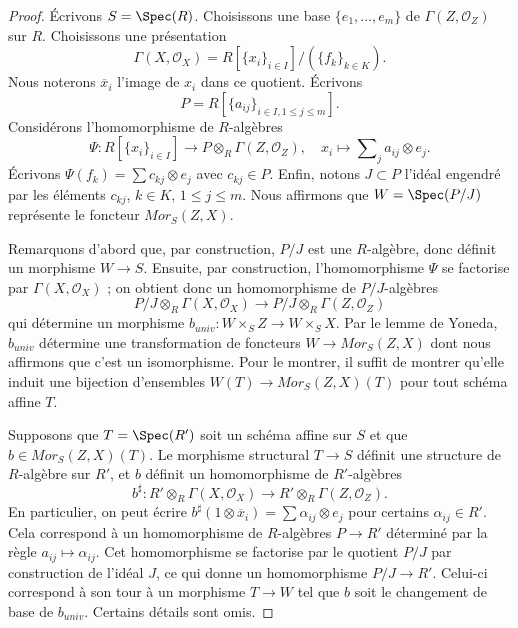\begin{proof}
Écrivons $S = \Spec(R)$. Choisissons une base $\{e_1, \ldots, e_m\}$
de $\Gamma(Z, \mathcal{O}_Z)$ sur $R$. Choisissons une présentation
$$
\Gamma(X, \mathcal{O}_X) = R[\{x_i\}_{i \in I}]/(\{f_k\}_{k \in K}).
$$
Nous noterons $\overline{x}_i$ l'image de $x_i$ dans ce quotient.
Écrivons
$$
P = R[\{a_{ij}\}_{i \in I, 1 \leq j \leq m}].
$$
Considérons l'homomorphisme de $R$-algèbres
$$
\Psi :
R[\{x_i\}_{i \in I}]
\longrightarrow
P \otimes_R \Gamma(Z, \mathcal{O}_Z), \quad
x_i \longmapsto \sum\nolimits_j a_{ij} \otimes e_j.
$$
Écrivons $\Psi(f_k) = \sum c_{kj} \otimes e_j$ avec $c_{kj} \in P$.
Enfin, notons $J \subset P$ l'idéal engendré par les éléments
$c_{kj}$, $k \in K$, $1 \leq j \leq m$. Nous affirmons que
$W = \Spec(P/J)$ représente le foncteur $\mathit{Mor}_S(Z, X)$.

\medskip\noindent
Remarquons d'abord que, par construction, $P/J$ est une $R$-algèbre, donc définit
un morphisme $W \to S$. Ensuite, par construction, l'homomorphisme
$\Psi$ se factorise par $\Gamma(X, \mathcal{O}_X)$ ; on obtient donc
un homomorphisme de $P/J$-algèbres
$$
P/J \otimes_R \Gamma(X, \mathcal{O}_X)
\longrightarrow
P/J \otimes_R \Gamma(Z, \mathcal{O}_Z)
$$
qui détermine un morphisme
$b_{univ} : W \times_S Z \to W \times_S X$.
Par le lemme de Yoneda, $b_{univ}$ détermine une
transformation de foncteurs $W \to \mathit{Mor}_S(Z, X)$ dont nous
affirmons que c'est un isomorphisme. Pour le montrer, il suffit
de montrer qu'elle induit une bijection d'ensembles
$W(T) \to \mathit{Mor}_S(Z, X)(T)$ pour tout schéma affine
$T$.

\medskip\noindent
Supposons que $T = \Spec(R')$ soit un schéma affine sur $S$
et que $b \in \mathit{Mor}_S(Z, X)(T)$. Le morphisme structural $T \to S$
définit une structure de $R$-algèbre sur $R'$, et $b$ définit un homomorphisme de $R'$-algèbres
$$
b^\sharp :
R' \otimes_R \Gamma(X, \mathcal{O}_X)
\longrightarrow
R' \otimes_R \Gamma(Z, \mathcal{O}_Z).
$$
En particulier, on peut écrire
$b^\sharp(1 \otimes \overline{x}_i) = \sum \alpha_{ij} \otimes e_j$
pour certains $\alpha_{ij} \in R'$. Cela correspond à un homomorphisme de $R$-algèbres
$P \to R'$ déterminé par la règle $a_{ij} \mapsto \alpha_{ij}$. Cet
homomorphisme se factorise par le quotient $P/J$ par construction de l'idéal
$J$, ce qui donne un homomorphisme $P/J \to R'$. Celui-ci correspond à son tour à un morphisme
$T \to W$ tel que $b$ soit le changement de base de $b_{univ}$.
Certains détails sont omis.
\end{proof}

